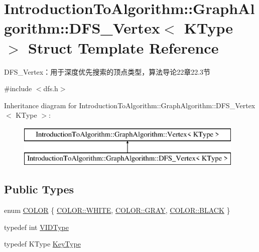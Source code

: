\hypertarget{struct_introduction_to_algorithm_1_1_graph_algorithm_1_1_d_f_s___vertex}{}\section{Introduction\+To\+Algorithm\+:\+:Graph\+Algorithm\+:\+:D\+F\+S\+\_\+\+Vertex$<$ K\+Type $>$ Struct Template Reference}
\label{struct_introduction_to_algorithm_1_1_graph_algorithm_1_1_d_f_s___vertex}


D\+F\+S\+\_\+\+Vertex：用于深度优先搜索的顶点类型，算法导论22章22.3节  




{\ttfamily \#include $<$dfs.\+h$>$}

Inheritance diagram for Introduction\+To\+Algorithm\+:\+:Graph\+Algorithm\+:\+:D\+F\+S\+\_\+\+Vertex$<$ K\+Type $>$\+:\begin{figure}[H]
\begin{center}
\leavevmode
\includegraphics[height=2.000000cm]{struct_introduction_to_algorithm_1_1_graph_algorithm_1_1_d_f_s___vertex}
\end{center}
\end{figure}
\subsection*{Public Types}
\begin{DoxyCompactItemize}
\item 
enum \hyperlink{struct_introduction_to_algorithm_1_1_graph_algorithm_1_1_d_f_s___vertex_a9455444fdfb1b29f24c1d27e74e7c124}{C\+O\+L\+O\+R} \{ \hyperlink{struct_introduction_to_algorithm_1_1_graph_algorithm_1_1_d_f_s___vertex_a9455444fdfb1b29f24c1d27e74e7c124ab5bf627e448384cf3a4c35121ca6008d}{C\+O\+L\+O\+R\+::\+W\+H\+I\+T\+E}, 
\hyperlink{struct_introduction_to_algorithm_1_1_graph_algorithm_1_1_d_f_s___vertex_a9455444fdfb1b29f24c1d27e74e7c124a48bf014c704c9eaae100a98006a37bf7}{C\+O\+L\+O\+R\+::\+G\+R\+A\+Y}, 
\hyperlink{struct_introduction_to_algorithm_1_1_graph_algorithm_1_1_d_f_s___vertex_a9455444fdfb1b29f24c1d27e74e7c124a08d0012388564e95c3b4a7407cf04965}{C\+O\+L\+O\+R\+::\+B\+L\+A\+C\+K}
 \}
\item 
typedef int \hyperlink{struct_introduction_to_algorithm_1_1_graph_algorithm_1_1_d_f_s___vertex_aeb115a10366eb62880d2672d4e1da7a1}{V\+I\+D\+Type}
\item 
typedef K\+Type \hyperlink{struct_introduction_to_algorithm_1_1_graph_algorithm_1_1_d_f_s___vertex_ab53cda3a7d135ed892b298c14d5579fe}{Key\+Type}
\end{DoxyCompactItemize}
